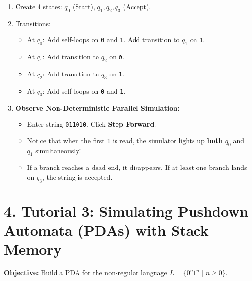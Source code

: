 \documentclass[11pt,a4paper]{article}
\begin{document}
\begin{enumerate}[leftmargin=1.5em, itemsep=4pt]
    \item Create 4 states: $q_0$ (Start), $q_1, q_2, q_3$ (Accept).
    \item Transitions:
    \begin{itemize}
        \item At $q_0$: Add self-loops on \texttt{0} and \texttt{1}. Add transition to $q_1$ on \texttt{1}.
        \item At $q_1$: Add transition to $q_2$ on \texttt{0}.
        \item At $q_2$: Add transition to $q_3$ on \texttt{1}.
        \item At $q_3$: Add self-loops on \texttt{0} and \texttt{1}.
    \end{itemize}
    \item \textbf{Observe Non-Deterministic Parallel Simulation:}
    \begin{itemize}
        \item Enter string \texttt{011010}. Click \textbf{Step Forward}.
        \item Notice that when the first \texttt{1} is read, the simulator lights up \textbf{both} $q_0$ and $q_1$ simultaneously!
        \item If a branch reaches a dead end, it disappears. If at least one branch lands on $q_3$, the string is accepted.
    \end{itemize}
\end{enumerate}

\vspace{8pt}

\section*{4. Tutorial 3: Simulating Pushdown Automata (PDAs) with Stack Memory}
\textbf{Objective:} Build a PDA for the non-regular language $L = \{0^n 1^n \mid n \ge 0\}$.
\end{document}
